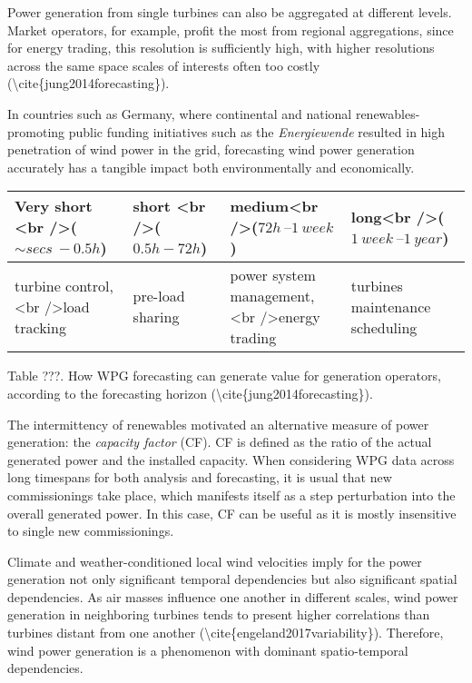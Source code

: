 \documentclass[
]{article}
\begin{document}
Power generation from single turbines can also be aggregated at
different levels. Market operators, for example, profit the most from
regional aggregations, since for energy trading, this resolution is
sufficiently high, with higher resolutions across the same space scales
of interests often too costly
(\textbackslash cite\{jung2014forecasting\}).

In countries such as Germany, where continental and national
renewables-promoting public funding initiatives such as the
\emph{Energiewende} resulted in high penetration of wind power in the
grid, forecasting wind power generation accurately has a tangible impact
both environmentally and economically.

\begin{longtable}[]{@{}llll@{}}
\toprule
Very short \textless br /\textgreater{}(\(\sim secs\ - 0.5h \)) & short
\textless br /\textgreater{}(\(0.5h - 72h\)) & medium\textless br
/\textgreater{}(\(72h\ – 1\ week \)) & long\textless br
/\textgreater{}(\(1\ week\  – 1\ year \))\tabularnewline
\midrule
\endhead
turbine control, \textless br /\textgreater{}load tracking & pre-load
sharing & power system management, \textless br /\textgreater{}energy
trading & turbines maintenance scheduling\tabularnewline
\bottomrule
\end{longtable}

Table ???. How WPG forecasting can generate value for generation
operators, according to the forecasting horizon
(\textbackslash cite\{jung2014forecasting\}).

The intermittency of renewables motivated an alternative measure of
power generation: the \emph{capacity factor} (CF). CF is defined as the
ratio of the actual generated power and the installed capacity. When
considering WPG data across long timespans for both analysis and
forecasting, it is usual that new commissionings take place, which
manifests itself as a step perturbation into the overall generated
power. In this case, CF can be useful as it is mostly insensitive to
single new commissionings.

Climate and weather-conditioned local wind velocities imply for the
power generation not only significant temporal dependencies but also
significant spatial dependencies. As air masses influence one another in
different scales, wind power generation in neighboring turbines tends to
present higher correlations than turbines distant from one another
(\textbackslash cite\{engeland2017variability\}). Therefore, wind power
generation is a phenomenon with dominant spatio-temporal dependencies.
\end{document}
